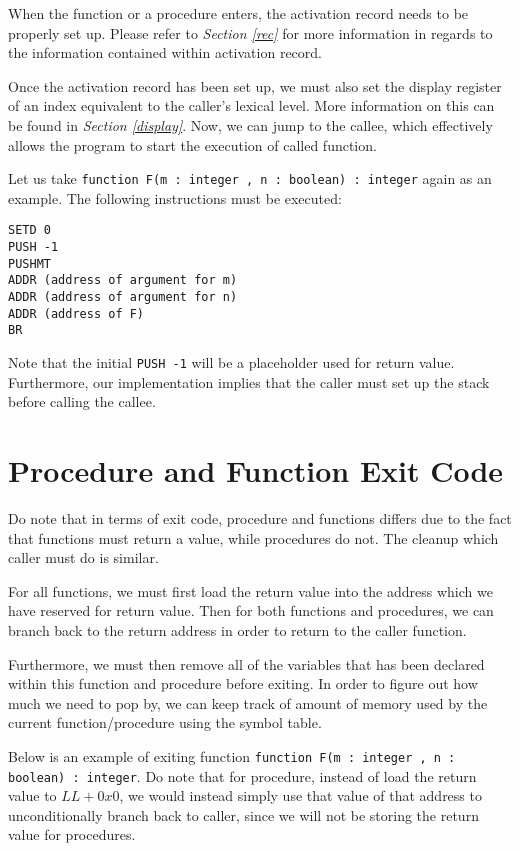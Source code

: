 \documentclass{article}
\begin{document}
When the function or a procedure enters, the activation record needs to be properly set up. Please refer to {\it Section \ref{rec}} for more information in regards to the information contained within activation record.

Once the activation record has been set up, we must also set the display register of an index equivalent to the caller's lexical level. More information on this can be found in {\it Section \ref{display}}. Now, we can jump to the callee, which effectively allows the program to start the execution of called function.

Let us take {\tt function F(m : integer , n : boolean) : integer} again as an example. The following instructions must be executed:

\begin{lstlisting}
SETD 0
PUSH -1
PUSHMT
ADDR (address of argument for m)
ADDR (address of argument for n)
ADDR (address of F)
BR
\end{lstlisting}

Note that the initial {\tt PUSH -1} will be a placeholder used for return value. Furthermore, our implementation implies that the caller must set up the stack before calling the callee.

\section{Procedure and Function Exit Code} \label{exit}

Do note that in terms of exit code, procedure and functions differs due to the fact that functions must return a value, while procedures do not. The cleanup which caller must do is similar.

For all functions, we must first load the return value into the address which we have reserved for return value. Then for both functions and procedures, we can branch back to the return address in order to return to the caller function.

Furthermore, we must then remove all of the variables that has been declared within this function and procedure before exiting. In order to figure out how much we need to pop by, we can keep track of amount of memory used by the current function/procedure using the symbol table.

Below is an example of exiting function {\tt function F(m : integer , n : boolean) : integer}. Do note that for procedure, instead of load the return value to $LL + 0x0$, we would instead simply use that value of that address to unconditionally branch back to caller, since we will not be storing the return value for procedures.
\end{document}
